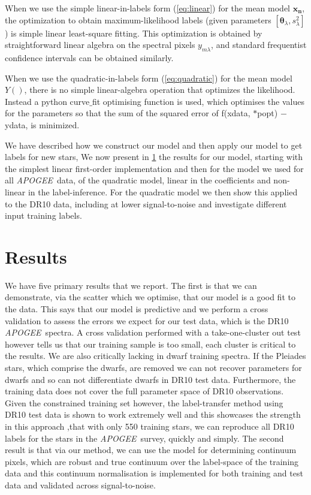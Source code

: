 \documentclass[12pt, preprint]{aastex}
\newcommand{\set}[1]{\bm{#1}}
\newcommand{\apogee}{\textsl{APOGEE}}
\begin{document}
When we use the simple linear-in-labels form (\ref{eq:linear}) for the
mean model $\set{x_n}$, the optimization to obtain maximum-likelihood labels
(given parameters $[\set{\theta}_\lambda, s_\lambda^2]$) is simple linear
least-square fitting.
This optimization is obtained by straightforward linear algebra on the
spectral pixels $y_{m\lambda}$, and standard frequentist confidence
intervals can be obtained similarly.

When we use the quadratic-in-labels form (\ref{eq:quadratic}) for the
mean model $Y()$, there is no simple linear-algebra operation that
optimizes the likelihood. Instead a python curve$\_$fit optimising function is used, which optimises the values for the parameters so that the sum of the squared error of f(xdata, $*$popt) $-$ ydata,  is minimized. 

We have described how we construct our model and then apply our model to get labels for new stars, We now present in \ref{sec:results} the results for our model, starting with the simplest linear first-order implementation and then for the model we used for all \apogee\ data, of the quadratic model, linear in the coefficients and non-linear in the label-inference.  For the quadratic model we then show this applied to the DR10 data, including at lower signal-to-noise and investigate different input training labels. 



\section{Results}
\label{sec:results}

We have five primary results that we report. The first is that we can demonstrate, via the scatter which we optimise, that our model is a good fit to the data. This says that our model is predictive and we perform a cross validation to assess the errors we expect for our test data, which is the DR10 \apogee\ spectra. A cross validation performed with a take-one-cluster out test however tells us that our training sample is too small, each cluster is critical to the results. We are also critically lacking in dwarf training spectra. If the Pleiades stars, which comprise the dwarfs, are removed we can not recover parameters for dwarfs and so can not differentiate dwarfs in DR10 test data. Furthermore, the training data does not cover the full parameter space of DR10 observations. Given the constrained training set however, the label-transfer method using DR10 test data is shown to work extremely well and this showcases the strength in this approach ,that with only 550 training stars, we can reproduce all DR10 labels for the stars in the \apogee\ survey, quickly and simply.  The second result is that via our method, we can use the model for determining continuum pixels, which are robust and true continuum over the label-space of the training data and this continuum normalisation is implemented for both training and test data and validated across signal-to-noise. 
\end{document}
